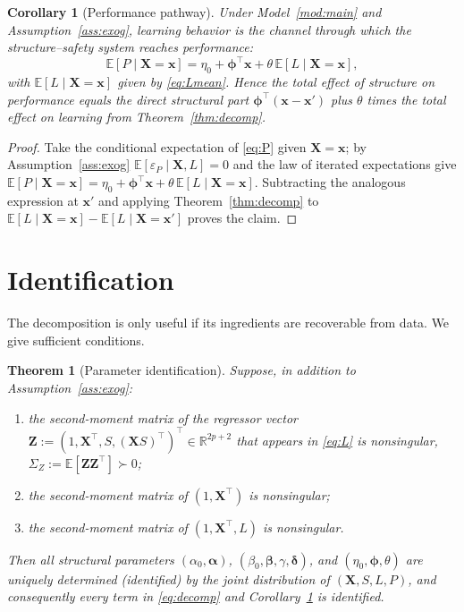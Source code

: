 \documentclass{amsart}
\theoremstyle{definition}
\theoremstyle{plain}
\newtheorem{theorem}{Theorem}
\newtheorem{corollary}{Corollary}
\begin{document}
\begin{corollary}[Performance pathway]\label{cor:perf}
Under Model~\ref{mod:main} and Assumption~\ref{ass:exog}, learning behavior is the channel
through which the structure--safety system reaches performance:
\[
\mathbb E[P\mid \bm X=\bm x]
=\eta_0+\bm\phi^\top\bm x+\theta\,\mathbb E[L\mid \bm X=\bm x],
\]
with $\mathbb E[L\mid \bm X=\bm x]$ given by \eqref{eq:Lmean}. Hence the total effect of
structure on performance equals the \emph{direct} structural part $\bm\phi^\top(\bm x-\bm
x')$ plus $\theta$ times the total effect on learning from Theorem~\ref{thm:decomp}.
\end{corollary}
\begin{proof}
Take the conditional expectation of \eqref{eq:P} given $\bm X=\bm x$; by
Assumption~\ref{ass:exog} $\mathbb E[\varepsilon_P\mid \bm X,L]=0$ and the law of iterated
expectations give $\mathbb E[P\mid\bm X=\bm x]=\eta_0+\bm\phi^\top\bm x
+\theta\,\mathbb E[L\mid\bm X=\bm x]$. Subtracting the analogous expression at $\bm x'$ and
applying Theorem~\ref{thm:decomp} to $\mathbb E[L\mid\bm X=\bm x]-\mathbb E[L\mid\bm
X=\bm x']$ proves the claim.
\end{proof}

\section{Identification}

The decomposition is only useful if its ingredients are recoverable from data. We give
sufficient conditions.

\begin{theorem}[Parameter identification]\label{thm:ident}
Suppose, in addition to Assumption~\ref{ass:exog}:
\begin{enumerate}
\item[(R1)] the second-moment matrix of the regressor vector
$\bm Z:=(1,\bm X^\top,S,(\bm X S)^\top)^\top\in\mathbb R^{2p+2}$ that appears in
\eqref{eq:L} is nonsingular, $\Sigma_Z:=\mathbb E[\bm Z\bm Z^\top]\succ 0$;
\item[(R2)] the second-moment matrix of $(1,\bm X^\top)$ is nonsingular;
\item[(R3)] the second-moment matrix of $(1,\bm X^\top,L)$ is nonsingular.
\end{enumerate}
Then all structural parameters
$(\alpha_0,\bm\alpha)$, $(\beta_0,\bm\beta,\gamma,\bm\delta)$, and
$(\eta_0,\bm\phi,\theta)$ are uniquely determined (identified) by the joint distribution of
$(\bm X,S,L,P)$, and consequently every term in \eqref{eq:decomp} and Corollary~\ref{cor:perf}
is identified.
\end{theorem}
\end{document}
